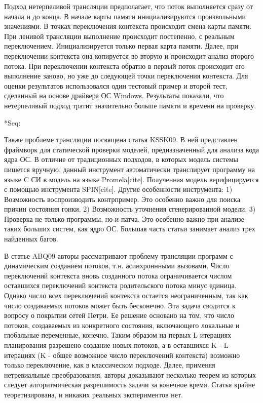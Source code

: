 Подход нетерпеливой трансляции предполагает, что поток выполняется сразу от начала и до конца. В начале карты памяти инициализируются произвольными значениями. В точках переключения контекста происходит смена карты памяти.
При ленивой трансляции выполнение происходит постепенно, с реальным переключением. Инициализируется только первая карта памяти. Далее, при переключении контекста она копируется во вторую и происходит анализ второго потока. При переключении контекста обратно в первый поток происходит его выполнение заново, но уже до следующей точки переключения контекста. 
Для оценки результатов использовался один тестовый пример и второй тест, сделанный на основе драйвера ОС Windows. Результаты показали, что нетерпеливый подход тратит значительно больше памяти и времени на проверку.

*Seq: ~\cite{Inverso:2014, Tomasco:2015}

Также проблеме трансляции посвящена статья KSSK09. В ней представлен фраймворк для статической проверки моделей, предназначенный для анализа кода ядра ОС. В отличие от традиционных подходов, в которых модель системы пишется вручную, данный инструмент автоматически транслирует программу на языке C СИ в модель на языке Promela[cite]. Полученная модель верифицируется с помощью инструмента SPIN[cite]. Другие особенности инструмента:
1) Возможность воспроизводить контрпример. Это особенно важно для поиска причин состояния гонки.
2) Возможность уточнения сгенерированной модели. 
3) Проверка не только программы, но и патча. Это особенно важно при анализе таких больших систем, как ядро ОС. 
Большая часть статьи занимает анализ трех найденных багов.

В статье ABQ09 авторы рассматривают проблему трансляции программ с динамическим созданием потоков, т.н. асинхроннными вызовами. Число переключений контекста вновь созданного потока ограничивается числом оставшихся переключений контекста родительского потока минус единица. Однако число всех переключений контекста остается неограниченным, так как число создаваемых потоков может быть бесконечно. Эта задача сводится к вопросу о покрытии сетей Петри. Ее решение основано на том, что число потоков, создаваемых из конкретного состояния, включающего локальные и глобальные переменные, конечно. Таким образом на первых L итерациях планирования разрешено создание новых потоков, а в оставшихся K - L итерациях (K - общее возможное число переключений контекста) возможно только переключение, как в классическом подходе. Далее, применяя нетревиальные преобразования, авторы доказывают несколько теорем из которых следует алгоритмическая разрешимость задачи за конечное время.  
Статья крайне теоретизирована, и никаких реальных экспериментов нет.

